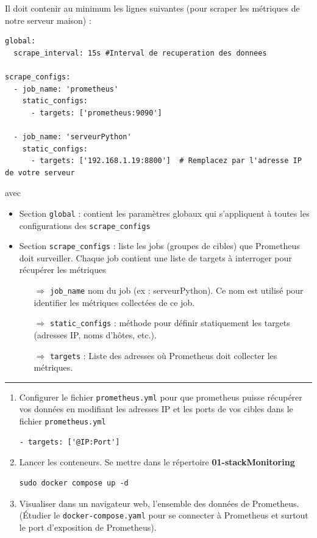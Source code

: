 \documentclass[french, 12pt]{article}%
\newcommand{\itemE}{\item[$\bullet$]}
\begin{document}
Il doit contenir au minimum les lignes suivantes (pour scraper les métriques de notre serveur maison) : 
\begin{lstlisting}[style=commande]
global:
  scrape_interval: 15s #Interval de recuperation des donnees
  
scrape_configs:
  - job_name: 'prometheus'
    static_configs:
      - targets: ['prometheus:9090']
      
  - job_name: 'serveurPython'
    static_configs:
      - targets: ['192.168.1.19:8800']  # Remplacez par l'adresse IP de votre serveur
\end{lstlisting}
avec
\begin{itemize}
\itemE Section \verb?global? : contient les paramètres globaux qui s'appliquent à toutes les configurations des \verb?scrape_configs?
\itemE Section \verb?scrape_configs? : liste les jobs (groupes de cibles) que Prometheus doit surveiller. Chaque job contient une liste de targets à interroger pour récupérer les métriques
	\begin{itemize}
	\item[$\Rightarrow$] \verb?job_name? nom du job (ex : serveurPython). Ce nom est utilisé pour identifier les métriques collectées de ce job.
	\item[$\Rightarrow$] \verb?static_configs?	: méthode pour définir statiquement les targets (adresses IP, noms d'hôtes, etc.).
	\item[$\Rightarrow$] \verb?targets?	: Liste des adresses où Prometheus doit collecter les métriques.
	\end{itemize}
\end{itemize}


\begin{center}
 \rule{0.75\linewidth}{1pt}
 \end{center}

\begin{enumerate}[resume]
\item Configurer le fichier \verb?prometheus.yml? pour que prometheus puisse récupérer vos données en modifiant les adresses IP et les ports de vos cibles dans le fichier \verb?prometheus.yml?
\begin{lstlisting}[style=commande]
  - targets: ['@IP:Port'] 
\end{lstlisting} 


\item Lancer les conteneurs. Se mettre dans le répertoire \textbf{01-stackMonitoring}
\begin{lstlisting}[style=commande]
 sudo docker compose up -d
\end{lstlisting} 

\item Visualiser dans un navigateur web, l'ensemble des données de Prometheus. (Étudier le \verb?docker-compose.yaml? pour se connecter à Prometheus et surtout le port d'exposition de Prometheus).
\end{enumerate}
\end{document}
